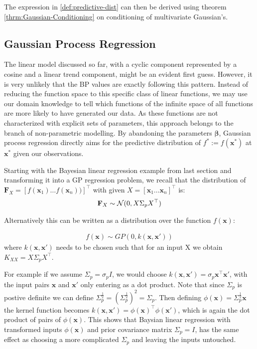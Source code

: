 The expression in \ref{def:predictive-dist} can then be derived using theorem \ref{thrm:Gaussian-Conditioning} on
conditioning of multivariate Gaussian's.

\subsection{Gaussian Process Regression}
The linear model discussed so far, with a cyclic component represented by a cosine and a linear trend component,
might be an evident first guess. However, it is very unlikely that the BP values are exactly following this pattern.
Instead of reducing the function space to this specific class of linear functions, we may use our domain knowledge
to tell which functions of the infinite space of all functions are more likely to have generated our data.
As these functions are not characterized with explicit sets of
parameters, this approach belongs to the branch of non-parametric modelling.
By abandoning the parameters $\boldsymbol{\beta}$, Gaussian process regression
directly aims for the predictive distribution of $f^{\ast} := f(\mathbf{x}^{\ast})$ at $\mathbf{x}^{\ast}$ given our observations.

Starting with the Bayesian linear regression example from last section and transforming it into a GP regression
problem, we recall that the distribution of $\mathbf{F}_X = [f(\mathbf{x}_1) \dots f(\mathbf{x}_n))]^{\top}$ with given $X = [\mathbf{x}_1 \dots \mathbf{x}_n]^{\top}$ is:
\begin{gather*}
    \mathbf{F}_X \sim \operatorname{\mathcal{N}}(0,  X \Sigma_p X^{\top})
\end{gather*}

Alternatively this can be written as a distribution over the function $f(\mathbf{x})$:

\begin{gather*}
    f(\mathbf{x}) \sim GP(0, k(\mathbf{x}, \mathbf{x}'))
\end{gather*}
where $k(\mathbf{x},\mathbf{x}')$ needs to be chosen such that for an input X we obtain $K_{XX} =  X \Sigma_p X^{\top}$.

For example if we assume $\Sigma_p = \sigma_p I$, we would choose $k(\mathbf{x},\mathbf{x}') = \sigma_p \mathbf{x}^{\top} \mathbf{x}'$, with the
input pairs $\mathbf{x}$ and $\mathbf{x}'$ only entering as a dot product.
Note that since $\Sigma_p$ is postive definite we can define $\Sigma_p^{\frac{1}{2}} = (\Sigma_p^{\frac{1}{2}})^2=\Sigma_p$.
Then defining $\phi(\mathbf{x}) = \Sigma_p^{\frac{1}{2}} \mathbf{x}$ the kernel function becomes $k(\mathbf{x}, \mathbf{x}') = \phi(\mathbf{x})^{\top} \phi(\mathbf{x}')$,
which is again the dot product of pairs of $\phi(\mathbf{x})$.
This shows that Baysian linear regression with transformed inputs $\phi(\mathbf{x})$ and prior covariance matrix $\Sigma_p = I$,
has the same effect as choosing a more complicated $\Sigma_p$ and leaving the inputs untouched.


